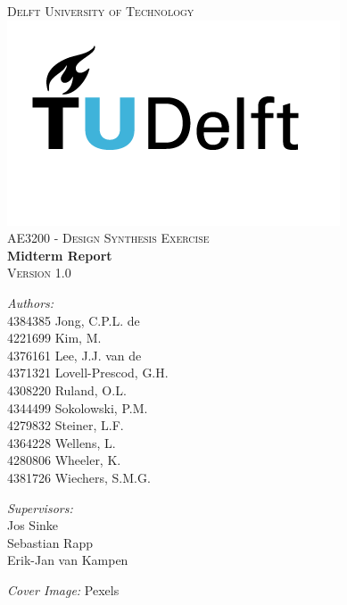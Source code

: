 \begin{titlepage}
\begin{center}

\textsc{\LARGE Delft University of Technology}\\[1.5cm]
\includegraphics[scale=0.45]{TU_Delft_logo_RGB.png}\\[0.5cm]
\textsc{\Large AE3200 - Design Synthesis Exercise}\\[0.5cm]
{\huge\textbf{Midterm Report} \\[.2cm] \Large\textsc{Version 1.0}\\[1.0cm]}

\begin{minipage}[t]{0.4\textwidth}
\begin{flushleft} \large
\emph{Authors:}\\
    4384385  Jong, C.P.L. de\\
    4221699  Kim, M.\\
    4376161  Lee, J.J. van de\\
    4371321  Lovell-Prescod, G.H.\\
    4308220  Ruland, O.L.\\
    4344499  Sokolowski, P.M.\\
    4279832  Steiner, L.F.\\
    4364228  Wellens, L.\\
    4280806  Wheeler, K.\\
    4381726  Wiechers, S.M.G.
    

\end{flushleft}
\end{minipage}
\begin{minipage}[t]{0.4\textwidth}
\begin{flushright} \large
\emph{Supervisors:} \\
    Jos Sinke\\
    Sebastian Rapp\\
    Erik-Jan van Kampen
    
    
\end{flushright}
\end{minipage}
\vfill
\textit{Cover Image:} Pexels\\
\small
\url{}

\end{center}
\end{titlepage}
\restoregeometry